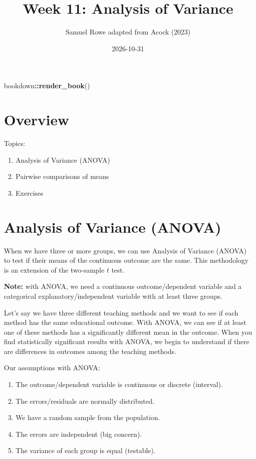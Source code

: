 \documentclass[
]{book}
\title{Week 11: Analysis of Variance}
\author{Samuel Rowe adapted from Acock (2023)}
\date{2026-10-31}
\newenvironment{Shaded}{\begin{snugshade}}{\end{snugshade}}
\newcommand{\FunctionTok}[1]{\textcolor[rgb]{0.13,0.29,0.53}{\textbf{#1}}}
\newcommand{\NormalTok}[1]{#1}
\newcommand{\SpecialCharTok}[1]{\textcolor[rgb]{0.81,0.36,0.00}{\textbf{#1}}}
\providecommand{\tightlist}{%
  \setlength{\itemsep}{0pt}\setlength{\parskip}{0pt}}
\begin{document}
\maketitle

{
\setcounter{tocdepth}{1}
\tableofcontents
}
\begin{Shaded}
\begin{Highlighting}[]
\NormalTok{bookdown}\SpecialCharTok{::}\FunctionTok{render\_book}\NormalTok{()}
\end{Highlighting}
\end{Shaded}

\chapter*{Overview}\label{overview}

Topics:

\begin{enumerate}
\def\labelenumi{\arabic{enumi}.}
\tightlist
\item
  Analysis of Variance (ANOVA)
\item
  Pairwise comparisons of means
\item
  Exercises
\end{enumerate}

\chapter{Analysis of Variance (ANOVA)}\label{analysis-of-variance-anova}

When we have three or more groups, we can use Analysis of Variance (ANOVA) to test if their means of the continuous outcome are the same. This methodology is an extension of the two-sample \(t\) test.

\textbf{Note:} with ANOVA, we need a continuous outcome/dependent variable and a categorical explanatory/independent variable with at least three groups.

Let's say we have three different teaching methods and we want to see if each method has the same educational outcome. With ANOVA, we can see if at least one of these methods has a significantly different mean in the outcome. When you find statistically significant results with ANOVA, we begin to understand if there are differences in outcomes among the teaching methods.

Our assumptions with ANOVA:

\begin{enumerate}
\def\labelenumi{\arabic{enumi}.}
\tightlist
\item
  The outcome/dependent variable is continuous or discrete (interval).
\item
  The errors/residuals are normally distributed.
\item
  We have a random sample from the population.
\item
  The errors are independent (big concern).
\item
  The variance of each group is equal (testable).
\end{enumerate}
\end{document}
